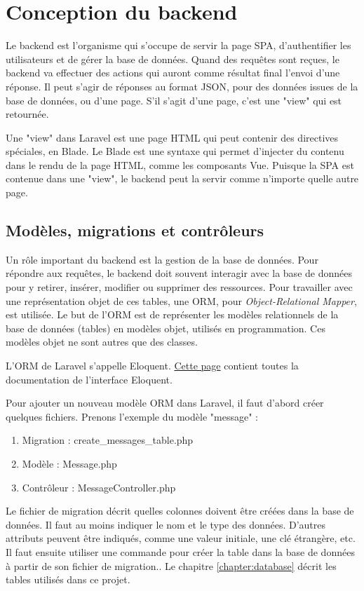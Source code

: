 \documentclass[
    iai, %
    eai, %
]{heig-tb}
\begin{document}
\newpage
\chapter{Conception du backend}
Le backend est l'organisme qui s'occupe de servir la page SPA, d'authentifier les utilisateurs et de gérer la base de données.
Quand des requêtes sont reçues, le backend va effectuer des actions qui auront comme résultat final l'envoi d'une réponse. Il peut s'agir de réponses au format JSON, pour des données issues de la base de données, ou d'une page. S'il s'agit d'une page, c'est une "view" qui est retournée.

Une "view" dans Laravel est une page HTML qui peut contenir des directives spéciales, en Blade. Le Blade est une syntaxe qui permet d'injecter du contenu dans le rendu de la page HTML, comme les composants Vue. Puisque la SPA est contenue dans une "view", le backend peut la servir comme n'importe quelle autre page.

\section{Modèles, migrations et contrôleurs}
Un rôle important du backend est la gestion de la base de données. Pour répondre aux requêtes, le backend doit souvent interagir avec la base de données pour y retirer, insérer, modifier ou supprimer des ressources. Pour travailler avec une représentation objet de ces tables, une ORM, pour \emph{Object-Relational Mapper}, est utilisée. Le but de l'ORM est de représenter les modèles relationnels de la base de données (tables) en modèles objet, utilisés en programmation. Ces modèles objet ne sont autres que des classes.

L'ORM de Laravel s'appelle Eloquent. \href{https://laravel.com/docs/8.x/eloquent}{Cette page} contient toutes la documentation de l'interface Eloquent.

Pour ajouter un nouveau modèle ORM dans Laravel, il faut d'abord créer quelques fichiers. Prenons l'exemple du modèle "message" :
\begin{enumerate}
  \item Migration : create\_messages\_table.php
  \item Modèle : Message.php
  \item Contrôleur : MessageController.php
\end{enumerate}
\bigskip

Le fichier de migration décrit quelles colonnes doivent être créées dans la base de données. Il faut au moins indiquer le nom et le type des données. D'autres attributs peuvent être indiqués, comme une valeur initiale, une clé étrangère, etc. Il faut ensuite utiliser une commande pour créer la table dans la base de données à partir de son fichier de migration..
Le chapitre \ref{chapter:database} décrit les tables utilisés dans ce projet.
\end{document}
